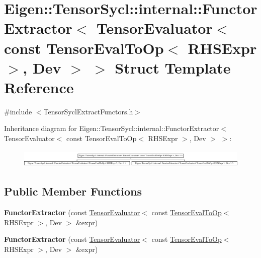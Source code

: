 \hypertarget{struct_eigen_1_1_tensor_sycl_1_1internal_1_1_functor_extractor_3_01_tensor_evaluator_3_01const_00cb481c3699f8d4e5fa68dcbf0785993}{}\section{Eigen\+:\+:Tensor\+Sycl\+:\+:internal\+:\+:Functor\+Extractor$<$ Tensor\+Evaluator$<$ const Tensor\+Eval\+To\+Op$<$ R\+H\+S\+Expr $>$, Dev $>$ $>$ Struct Template Reference}
\label{struct_eigen_1_1_tensor_sycl_1_1internal_1_1_functor_extractor_3_01_tensor_evaluator_3_01const_00cb481c3699f8d4e5fa68dcbf0785993}


{\ttfamily \#include $<$Tensor\+Sycl\+Extract\+Functors.\+h$>$}

Inheritance diagram for Eigen\+:\+:Tensor\+Sycl\+:\+:internal\+:\+:Functor\+Extractor$<$ Tensor\+Evaluator$<$ const Tensor\+Eval\+To\+Op$<$ R\+H\+S\+Expr $>$, Dev $>$ $>$\+:\begin{figure}[H]
\begin{center}
\leavevmode
\includegraphics[height=0.862866cm]{struct_eigen_1_1_tensor_sycl_1_1internal_1_1_functor_extractor_3_01_tensor_evaluator_3_01const_00cb481c3699f8d4e5fa68dcbf0785993}
\end{center}
\end{figure}
\subsection*{Public Member Functions}
\begin{DoxyCompactItemize}
\item 
\mbox{\label{struct_eigen_1_1_tensor_sycl_1_1internal_1_1_functor_extractor_3_01_tensor_evaluator_3_01const_00cb481c3699f8d4e5fa68dcbf0785993_a6ec19187ed000bc5e3b997e0d085ad32}} 
{\bfseries Functor\+Extractor} (const \hyperlink{struct_eigen_1_1_tensor_evaluator}{Tensor\+Evaluator}$<$ const \hyperlink{class_eigen_1_1_tensor_eval_to_op}{Tensor\+Eval\+To\+Op}$<$ R\+H\+S\+Expr $>$, Dev $>$ \&expr)
\item 
\mbox{\label{struct_eigen_1_1_tensor_sycl_1_1internal_1_1_functor_extractor_3_01_tensor_evaluator_3_01const_00cb481c3699f8d4e5fa68dcbf0785993_a6ec19187ed000bc5e3b997e0d085ad32}} 
{\bfseries Functor\+Extractor} (const \hyperlink{struct_eigen_1_1_tensor_evaluator}{Tensor\+Evaluator}$<$ const \hyperlink{class_eigen_1_1_tensor_eval_to_op}{Tensor\+Eval\+To\+Op}$<$ R\+H\+S\+Expr $>$, Dev $>$ \&expr)
\end{DoxyCompactItemize}
